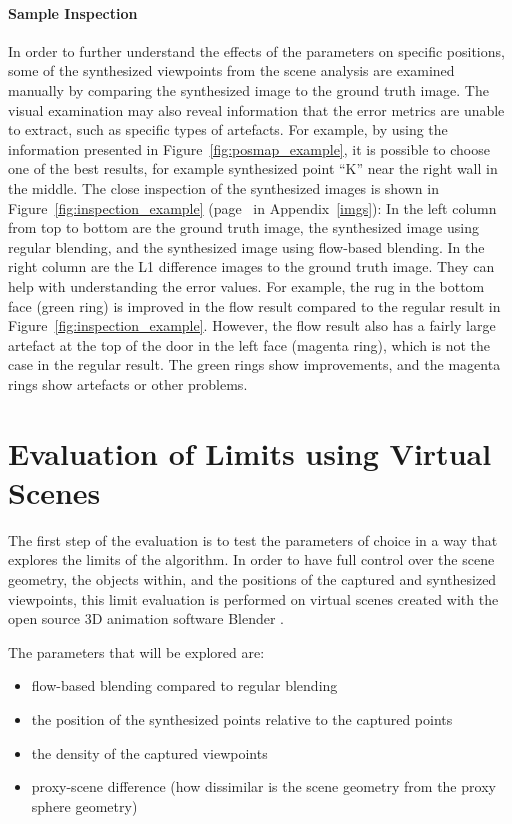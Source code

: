 \paragraph{Sample Inspection}
In order to further understand the effects of the parameters on specific positions, some of the synthesized viewpoints from the scene analysis are examined manually by comparing the synthesized image to the ground truth image. The visual examination may also reveal information that the error metrics are unable to extract, such as specific types of artefacts. For example, by using the information presented in Figure~\ref{fig:posmap_example}, it is possible to choose one of the best results, for example synthesized point ``K'' near the right wall in the middle. The close inspection of the synthesized images is shown in Figure~\ref{fig:inspection_example} (page~\pageref{fig:inspection_example} in Appendix~\ref{imgs}\footnotemark): In the left column from top to bottom are the ground truth image, the synthesized image using regular blending, and the synthesized image using flow-based blending. In the right column are the L1 difference images to the ground truth image. They can help with understanding the error values. For example, the rug in the bottom face (green ring) is improved in the flow result compared to the regular result in Figure~\ref{fig:inspection_example}. However, the flow result also has a fairly large artefact at the top of the door in the left face (magenta ring), which is not the case in the regular result. The green rings show improvements, and the magenta rings show artefacts or other problems.

\section{Evaluation of Limits using Virtual Scenes} \label{sec:limit_eval}
The first step of the evaluation is to test the parameters of choice in a way that explores the limits of the algorithm. In order to have full control over the scene geometry, the objects within, and the positions of the captured and synthesized viewpoints, this limit evaluation is performed on virtual scenes created with the open source 3D animation software Blender \cite{blender}.

The parameters that will be explored are:
\begin{itemize}
  \item flow-based blending compared to regular blending
  \item the position of the synthesized points relative to the captured points
  \item the density of the captured viewpoints
  \item proxy-scene difference (how dissimilar is the scene geometry from the proxy sphere geometry)
\end{itemize}

